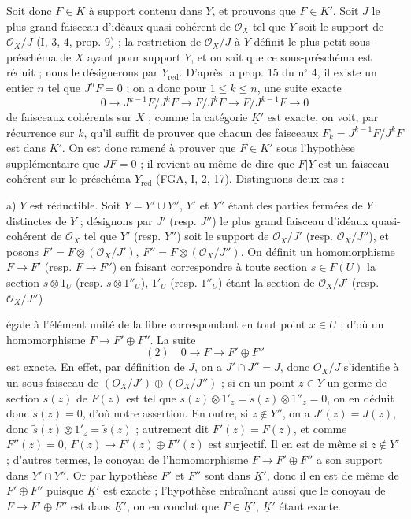 Soit donc $F \in \underline{K}$ à support contenu dans $Y$, et prouvons que $F \in \underline{K}'$. Soit $J$ le plus grand faisceau d'idéaux quasi-cohérent de $\mathcal{O}_X$ tel que $Y$ soit le support de $\mathcal{O}_X/J$ (I, 3, 4, prop. 9) ; la restriction de $\mathcal{O}_X/J$ à $Y$ définit le plus petit sous-préschéma de $X$ ayant pour support $Y$, et on sait que ce sous-préschéma est réduit ; nous le désignerons par $Y_{\text{red}}$. D'après la prop. 15 du n$^\circ$ 4, il existe un entier $n$ tel que $J^n F = 0$ ; on a donc pour $1 \le k \le n$, une suite exacte
$$0 \to J^{k-1}F/J^k F \to F/J^k F \to F/J^{k-1}F \to 0$$
de faisceaux cohérents sur $X$ ; comme la catégorie $\underline{K}'$ est exacte, on voit, par récurrence sur $k$, qu'il suffit de prouver que chacun des faisceaux $F_k = J^{k-1}F/J^k F$ est dans $\underline{K}'$. On est donc ramené à prouver que $F \in \underline{K}'$ sous l'hypothèse supplémentaire que $JF = 0$ ; il revient au même de dire que $F|Y$ est un faisceau cohérent sur le préschéma $Y_{\text{red}}$ (FGA, I, 2, 17). Distinguons deux cas :

a) $Y$ est réductible. Soit $Y = Y' \cup Y''$, $Y'$ et $Y''$ étant des parties fermées de $Y$ distinctes de $Y$ ; désignons par $J'$ (resp. $J''$) le plus grand faisceau d'idéaux quasi-cohérent de $\mathcal{O}_X$ tel que $Y'$ (resp. $Y''$) soit le support de $\mathcal{O}_X/J'$ (resp. $\mathcal{O}_X/J''$), et posons $F' = F \otimes (\mathcal{O}_X/J')$, $F'' = F \otimes (\mathcal{O}_X/J'')$. On définit un homomorphisme $F \to F'$ (resp. $F \to F''$) en faisant correspondre à toute section $s \in F(U)$ la section $s \otimes 1_U$ (resp. $s \otimes 1''_U$), $1'_U$ (resp. $1''_U$) étant la section de $\mathcal{O}_X/J'$ (resp. $\mathcal{O}_X/J''$)

\newpage


\noindent égale à l'élément unité de la fibre correspondant en tout point $x \in U$ ; d'où un homomorphisme $F \to F' \oplus F''$. La suite
$$(2) \quad 0 \to F \to F' \oplus F''$$
est exacte. En effet, par définition de $J$, on a $J' \cap J''=J$, donc $O_X/J$ s'identifie à un sous-faisceau de $(O_X/J') \oplus (O_X/J'')$ ; si en un point $z \in Y$ un germe de section $\tilde{s}(z)$ de $F(z)$ est tel que $\tilde{s}(z) \otimes 1'_z = \tilde{s}(z) \otimes 1''_z = 0$, on en déduit donc $\tilde{s}(z) = 0$, d'où notre assertion. En outre, si $z \notin Y''$, on a $J'(z)=J(z)$, donc $\tilde{s}(z) \otimes 1'_z = \tilde{s}(z)$ ; autrement dit $F'(z)=F(z)$, et comme $F''(z)=0$, $F(z) \to F'(z) \oplus F''(z)$ est surjectif. Il en est de même si $z \notin Y'$ ; d'autres termes, le conoyau de l'homomorphisme $F \to F' \oplus F''$ a son support dans $Y' \cap Y''$. Or par hypothèse $F'$ et $F''$ sont dans $\underline{K}'$, donc il en est de même de $F' \oplus F''$ puisque $\underline{K}'$ est exacte ; l'hypothèse entraînant aussi que le conoyau de $F \to F' \oplus F''$ est dans $\underline{K}'$, on en conclut que $F \in \underline{K}'$, $\underline{K}'$ étant exacte.

